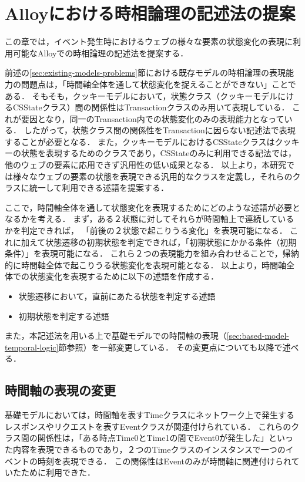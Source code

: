 \documentclass[12pt,a4paper]{jbook}
\begin{document}
\newpage

\chapter{Alloyにおける時相論理の記述法の提案}
\label{sec:ProposedModel-TemporalLogic}
この章では，イベント発生時におけるウェブの様々な要素の状態変化の表現に利用可能なAlloyでの時相論理の記述法を提案する．

前述の\ref{sec:existing-models-problems}節における既存モデルの時相論理の表現能力の問題点は，「時間軸全体を通して状態変化を捉えることができない」ことである．
そもそも，クッキーモデルにおいて，状態クラス（クッキーモデルにけるCSStateクラス）間の関係性はTransactionクラスのみ用いて表現している．
これが要因となり，同一のTransaction内での状態変化のみの表現能力となっている．
したがって，状態クラス間の関係性をTransactionに因らない記述法で表現することが必要となる．
また，クッキーモデルにおけるCSStateクラスはクッキーの状態を表現するためのクラスであり，CSStateのみに利用できる記法では，他のウェブの要素に応用できず汎用性の低い成果となる．
以上より，本研究では様々なウェブの要素の状態を表現できる汎用的なクラスを定義し，それらのクラスに統一して利用できる述語を提案する．

ここで，時間軸全体を通して状態変化を表現するためにどのような述語が必要となるかを考える．
まず，ある２状態に対してそれらが時間軸上で連続しているかを判定できれば，
「前後の２状態で起こりうる変化」を表現可能になる．
これに加えて状態遷移の初期状態を判定できれば，「初期状態にかかる条件（初期条件）」を表現可能になる．
これら２つの表現能力を組み合わせることで，帰納的に時間軸全体で起こりうる状態変化を表現可能となる．
以上より，時間軸全体での状態変化を表現するために以下の述語を作成する．
\begin{itemize}
\item 状態遷移において，直前にあたる状態を判定する述語
\item 初期状態を判定する述語
\end{itemize}

また，本記述法を用いる上で基礎モデルでの時間軸の表現（\ref{sec:based-model-temporal-logic}節参照）を一部変更している．
その変更点についても以降で述べる．

\section{時間軸の表現の変更}
基礎モデル\cite{based-model}においては，時間軸を表すTimeクラスにネットワーク上で発生するレスポンスやリクエストを表すEventクラスが関連付けられている．
これらのクラス間の関係性は，「ある時点Time0とTime1の間でEvent0が発生した」といった内容を表現できるものであり，２つのTimeクラスのインスタンスで一つのイベントの時刻を表現できる．
この関係性はEventのみが時間軸に関連付けられていたために利用できた．
\end{document}
